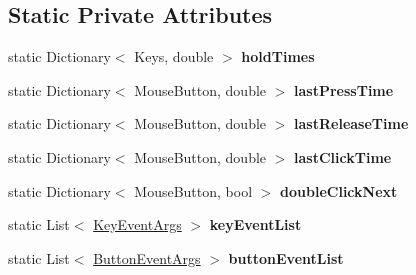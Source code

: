 \subsection*{Static Private Attributes}
\begin{DoxyCompactItemize}
\item 
\mbox{\label{class_n_g_sim_1_1_input_1_1_input_manager_a57393f97bf293a9c929bb75cf3bfe532}} 
static Dictionary$<$ Keys, double $>$ {\bfseries hold\+Times}
\item 
\mbox{\label{class_n_g_sim_1_1_input_1_1_input_manager_a0cb5e86ea56a56633af0617a24c3cb73}} 
static Dictionary$<$ Mouse\+Button, double $>$ {\bfseries last\+Press\+Time}
\item 
\mbox{\label{class_n_g_sim_1_1_input_1_1_input_manager_a88b37db9143b7855b69e0e54a7c8671a}} 
static Dictionary$<$ Mouse\+Button, double $>$ {\bfseries last\+Release\+Time}
\item 
\mbox{\label{class_n_g_sim_1_1_input_1_1_input_manager_a2a788ab2aa3ccd38af76197bed0d1c03}} 
static Dictionary$<$ Mouse\+Button, double $>$ {\bfseries last\+Click\+Time}
\item 
\mbox{\label{class_n_g_sim_1_1_input_1_1_input_manager_abfcf2e75b82c7b1779da426044dd8c81}} 
static Dictionary$<$ Mouse\+Button, bool $>$ {\bfseries double\+Click\+Next}
\item 
\mbox{\label{class_n_g_sim_1_1_input_1_1_input_manager_a095e9538023bb3d2bea03d11993a1037}} 
static List$<$ \hyperlink{struct_n_g_sim_1_1_input_1_1_input_manager_1_1_key_event_args}{Key\+Event\+Args} $>$ {\bfseries key\+Event\+List}
\item 
\mbox{\label{class_n_g_sim_1_1_input_1_1_input_manager_ab8e4db9f565c4813ff4fac80e94b1904}} 
static List$<$ \hyperlink{struct_n_g_sim_1_1_input_1_1_input_manager_1_1_button_event_args}{Button\+Event\+Args} $>$ {\bfseries button\+Event\+List}
\item 
\mbox{\label{class_n_g_sim_1_1_input_1_1_input_manager_a1fb7d7cc87c6fa3519250b277ca24292}} 

\end{DoxyCompactItemize}
